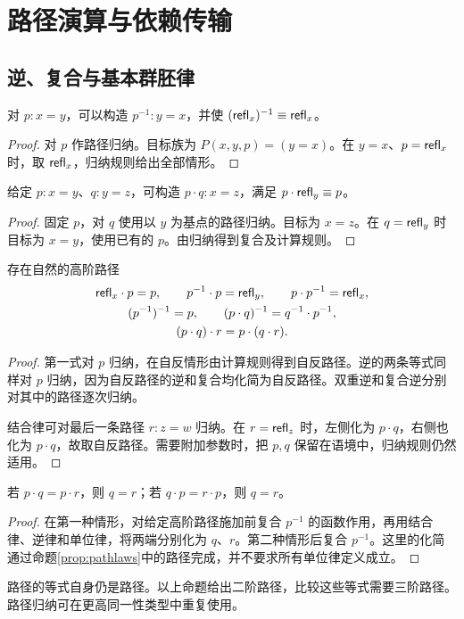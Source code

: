 \chapter{路径演算与依赖传输}
\section{逆、复合与基本群胚律}
\begin{proposition}[路径逆]
对 $p:x=y$，可以构造 $p^{-1}:y=x$，并使 $(\mathsf{refl}_x)^{-1}\equiv\mathsf{refl}_x$。
\end{proposition}
\begin{proof}
对 $p$ 作路径归纳。目标族为 $P(x,y,p)=(y=x)$。在 $y=x$、$p=\mathsf{refl}_x$ 时，取 $\mathsf{refl}_x$，归纳规则给出全部情形。
\end{proof}
\begin{proposition}[路径复合]
给定 $p:x=y$、$q:y=z$，可构造 $p\cdot q:x=z$，满足 $p\cdot\mathsf{refl}_y\equiv p$。
\end{proposition}
\begin{proof}
固定 $p$，对 $q$ 使用以 $y$ 为基点的路径归纳。目标为 $x=z$。在 $q=\mathsf{refl}_y$ 时目标为 $x=y$，使用已有的 $p$。由归纳得到复合及计算规则。
\end{proof}
\begin{proposition}[单位、逆与结合律]\label{prop:pathlaws}
存在自然的高阶路径
\begin{gather*}
\mathsf{refl}_x\cdot p=p,
\qquad p^{-1}\cdot p=\mathsf{refl}_y,
\qquad p\cdot p^{-1}=\mathsf{refl}_x,\\
(p^{-1})^{-1}=p,
\qquad(p\cdot q)^{-1}=q^{-1}\cdot p^{-1},\\
(p\cdot q)\cdot r=p\cdot(q\cdot r).
\end{gather*}
\end{proposition}
\begin{proof}
第一式对 $p$ 归纳，在自反情形由计算规则得到自反路径。逆的两条等式同样对 $p$ 归纳，因为自反路径的逆和复合均化简为自反路径。双重逆和复合逆分别对其中的路径逐次归纳。

结合律可对最后一条路径 $r:z=w$ 归纳。在 $r=\mathsf{refl}_z$ 时，左侧化为 $p\cdot q$，右侧也化为 $p\cdot q$，故取自反路径。需要附加参数时，把 $p,q$ 保留在语境中，归纳规则仍然适用。
\end{proof}
\begin{lemma}[左右消去]
若 $p\cdot q=p\cdot r$，则 $q=r$；若 $q\cdot p=r\cdot p$，则 $q=r$。
\end{lemma}
\begin{proof}
在第一种情形，对给定高阶路径施加前复合 $p^{-1}$ 的函数作用，再用结合律、逆律和单位律，将两端分别化为 $q$、$r$。第二种情形后复合 $p^{-1}$。这里的化简通过命题\ref{prop:pathlaws}中的路径完成，并不要求所有单位律定义成立。
\end{proof}
\begin{remark}
路径的等式自身仍是路径。以上命题给出二阶路径，比较这些等式需要三阶路径。路径归纳可在更高同一性类型中重复使用。
\end{remark}

